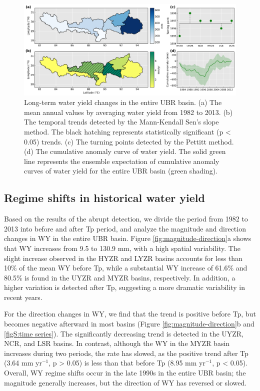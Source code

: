 \documentclass[hess, manuscript]{copernicus}
\begin{document}
\begin{figure}[ht]
    \includegraphics[width=\textwidth]{02-figures/spatial-changes-in-water-yield.png}
    \caption{Long-term water yield changes in the entire UBR basin.
    (a) The mean annual values by averaging water yield from 1982 to 2013. (b) The temporal trends detected by the Mann-Kendall Sen’s slope method. The black hatching represents statistically significant (p < 0.05) trends. (c) The turning points detected by the Pettitt method. (d) The cumulative anomaly curve of water yield. The solid green line represents the ensemble expectation of cumulative anomaly curves of water yield for the entire UBR basin (green shading).}
    \label{fig:water-yield}
\end{figure}

\subsection{Regime shifts in historical water yield}
Based on the results of the abrupt detection, we divide the period from 1982 to 2013 into before and after Tp period, and analyze the magnitude and direction changes in WY in the entire UBR basin. Figure \ref{fig:magnitude-direction}a shows that WY increases from 9.5 to 130.9 mm, with a high spatial variability. The slight increase observed in the HYZR and LYZR basins accounts for less than 10\% of the mean WY before Tp, while a substantial WY increase of 61.6\% and 80.5\% is found in the UYZR and MYZR basins, respectively. In addition, a higher variation is detected after Tp, suggesting a more dramatic variability in recent years.

For the direction changes in WY, we find that the trend is positive before Tp, but becomes negative afterward in most basins (Figure \ref{fig:magnitude-direction}b and \ref{figS:time series}). The significantly decreasing trend is detected in the UYZR, NCR, and LSR basins. In contrast, although the WY in the MYZR basin increases during two periods, the rate has slowed, as the positive trend after Tp (3.64 mm yr$^{−1}$, p > 0.05) is less than that before Tp (8.95 mm yr$^{−1}$, p < 0.05). Overall, WY regime shifts occur in the late 1990s in the entire UBR basin; the magnitude generally increases, but the direction of WY has reversed or slowed.
\end{document}
